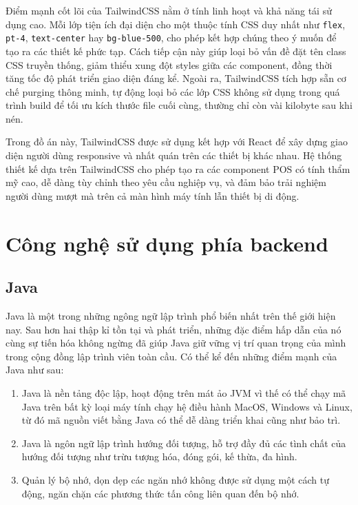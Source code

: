 \documentclass[../20232006p.tex]{subfiles}
\begin{document}
Điểm mạnh cốt lõi của TailwindCSS nằm ở tính linh hoạt và khả năng tái sử dụng cao. Mỗi lớp tiện ích đại diện cho một thuộc tính CSS duy nhất như \texttt{flex}, \texttt{pt-4}, \texttt{text-center} hay \texttt{bg-blue-500}, cho phép kết hợp chúng theo ý muốn để tạo ra các thiết kế phức tạp. Cách tiếp cận này giúp loại bỏ vấn đề đặt tên class CSS truyền thống, giảm thiểu xung đột styles giữa các component, đồng thời tăng tốc độ phát triển giao diện đáng kể. Ngoài ra, TailwindCSS tích hợp sẵn cơ chế purging thông minh, tự động loại bỏ các lớp CSS không sử dụng trong quá trình build để tối ưu kích thước file cuối cùng, thường chỉ còn vài kilobyte sau khi nén.

Trong đồ án này, TailwindCSS được sử dụng kết hợp với React để xây dựng giao diện người dùng responsive và nhất quán trên các thiết bị khác nhau. Hệ thống thiết kế dựa trên TailwindCSS cho phép tạo ra các component POS có tính thẩm mỹ cao, dễ dàng tùy chỉnh theo yêu cầu nghiệp vụ, và đảm bảo trải nghiệm người dùng mượt mà trên cả màn hình máy tính lẫn thiết bị di động.


\section{Công nghệ sử dụng phía backend}
\subsection{Java}

Java \cite{java} là một trong những ngông ngữ lập trình phổ biến nhất trên thế giới hiện nay. Sau hơn hai thập kỉ tồn tại và phát triển, những đặc điểm hấp dẫn của nó cùng sự tiến hóa không ngừng đã giúp Java giữ vững vị trí quan trọng của mình trong cộng đồng lập trình viên toàn cầu. Có thể kể đến những điểm mạnh của Java như sau:

\begin{enumerate}[label=(\roman*)]
    \item Java là nền tảng độc lập, hoạt động trên mát ảo JVM vì thế có thể chạy mã Java trên bất kỳ loại máy tính chạy hệ điều hành MacOS, Windows và Linux, từ đó mã nguồn viết bằng Java có thể dễ dàng triển khai cũng như bảo trì.
    \item Java là ngôn ngữ lập trình hướng đối tượng, hỗ trợ đầy đủ các tình chất của hướng đối tượng như trừu tượng hóa, đóng gói, kế thừa, đa hình.
    \item  Quản lý bộ nhớ, dọn dẹp các ngăn nhớ không được sử dụng một cách tự động, ngăn chặn các phương thức tấn công liên quan đến bộ nhớ.
\end{enumerate}
\end{document}
